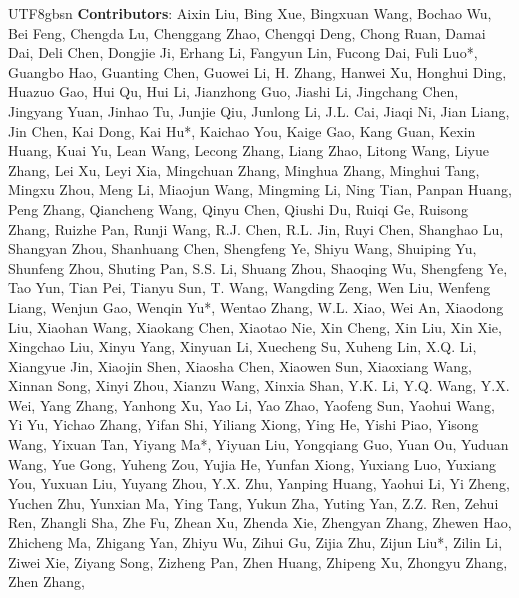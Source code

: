 \documentclass[11pt, a4paper, logo, copyright, nonumbering]{deepseek}
\begin{document}
\begin{CJK*}{UTF8}{gbsn}
\textbf{ Contributors}:
 Aixin Liu,
 Bing Xue,
 Bingxuan Wang,
 Bochao Wu,
 Bei Feng,
 Chengda Lu,
 Chenggang Zhao,
 Chengqi Deng,
 Chong Ruan,
 Damai Dai,
 Deli Chen,
 Dongjie Ji,
 Erhang Li,
 Fangyun Lin,
 Fucong Dai,
 Fuli Luo*,
 Guangbo Hao,
 Guanting Chen,
 Guowei Li,
 H. Zhang,
 Hanwei Xu,
 Honghui Ding,
 Huazuo Gao,
 Hui Qu,
 Hui Li,
 Jianzhong Guo,
 Jiashi Li,
 Jingchang Chen,
 Jingyang Yuan,
 Jinhao Tu,
 Junjie Qiu,
 Junlong Li,
 J.L. Cai,
 Jiaqi Ni,
 Jian Liang,
 Jin Chen,
 Kai Dong,
 Kai Hu*,
 Kaichao You,
 Kaige Gao,
 Kang Guan,
 Kexin Huang,
 Kuai Yu,
 Lean Wang,
 Lecong Zhang,
 Liang Zhao,
 Litong Wang,
 Liyue Zhang,
 Lei Xu,
 Leyi Xia,
 Mingchuan Zhang,
 Minghua Zhang,
 Minghui Tang,
 Mingxu Zhou,
 Meng Li,
 Miaojun Wang,
 Mingming Li,
 Ning Tian,
 Panpan Huang,
 Peng Zhang,
 Qiancheng Wang,
 Qinyu Chen,
 Qiushi Du,
 Ruiqi Ge,
 Ruisong Zhang,
 Ruizhe Pan,
 Runji Wang,
 R.J. Chen,
 R.L. Jin,
 Ruyi Chen,
 Shanghao Lu,
 Shangyan Zhou,
 Shanhuang Chen,
 Shengfeng Ye,
 Shiyu Wang,
 Shuiping Yu,
 Shunfeng Zhou,
 Shuting Pan,
 S.S. Li,
 Shuang Zhou,
 Shaoqing Wu,
 Shengfeng Ye,
 Tao Yun,
 Tian Pei,
 Tianyu Sun,
 T. Wang,
 Wangding Zeng,
 Wen Liu,
 Wenfeng Liang,
 Wenjun Gao,
 Wenqin Yu*,
 Wentao Zhang,
 W.L. Xiao,
 Wei An,
 Xiaodong Liu,
 Xiaohan Wang,
 Xiaokang Chen,
 Xiaotao Nie,
 Xin Cheng,
 Xin Liu,
 Xin Xie,
 Xingchao Liu,
 Xinyu Yang,
 Xinyuan Li,
 Xuecheng Su,
 Xuheng Lin,
 X.Q. Li,
 Xiangyue Jin,
 Xiaojin Shen,
 Xiaosha Chen,
 Xiaowen Sun,
 Xiaoxiang Wang,
 Xinnan Song,
 Xinyi Zhou,
 Xianzu Wang,
 Xinxia Shan,
 Y.K. Li,
 Y.Q. Wang,
 Y.X. Wei,
 Yang Zhang,
 Yanhong Xu,
 Yao Li,
 Yao Zhao,
 Yaofeng Sun,
 Yaohui Wang,
 Yi Yu,
 Yichao Zhang,
 Yifan Shi,
 Yiliang Xiong,
 Ying He,
 Yishi Piao,
 Yisong Wang,
 Yixuan Tan,
 Yiyang Ma*,
 Yiyuan Liu,
 Yongqiang Guo,
 Yuan Ou,
 Yuduan Wang,
 Yue Gong,
 Yuheng Zou,
 Yujia He,
 Yunfan Xiong,
 Yuxiang Luo,
 Yuxiang You,
 Yuxuan Liu,
 Yuyang Zhou,
 Y.X. Zhu,
 Yanping Huang,
 Yaohui Li,
 Yi Zheng,
 Yuchen Zhu,
 Yunxian Ma,
 Ying Tang,
 Yukun Zha,
 Yuting Yan,
 Z.Z. Ren,
 Zehui Ren,
 Zhangli Sha,
 Zhe Fu,
 Zhean Xu,
 Zhenda Xie,
 Zhengyan Zhang,
 Zhewen Hao,
 Zhicheng Ma,
 Zhigang Yan,
 Zhiyu Wu,
 Zihui Gu,
 Zijia Zhu,
 Zijun Liu*,
 Zilin Li,
 Ziwei Xie,
 Ziyang Song,
 Zizheng Pan,
 Zhen Huang,
 Zhipeng Xu,
 Zhongyu Zhang,
 Zhen Zhang,






\end{CJK*}
\end{document}
